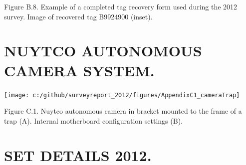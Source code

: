 \documentclass[12pt]{article}\usepackage[]{graphicx}\usepackage[]{color}
\begin{document}
\begin{appendices}
Figure B.8. Example of a completed tag recovery form used during the 2012 survey. Image of recovered tag B9924900 (inset).

\clearpage

\section{NUYTCO AUTONOMOUS CAMERA SYSTEM.}
\label{app:third-appendix}
\begin{flushleft}\texttt{[image: c:/github/surveyreport\_2012/figures/AppendixC1\_cameraTrap]} \end{flushleft}

Figure C.1. Nuytco autonomous camera in bracket mounted to the frame of a trap (A). Internal motherboard configuration settings (B).

\section{SET DETAILS 2012.}
\label{app:fourth-appendix}


\end{appendices}
\end{document}
